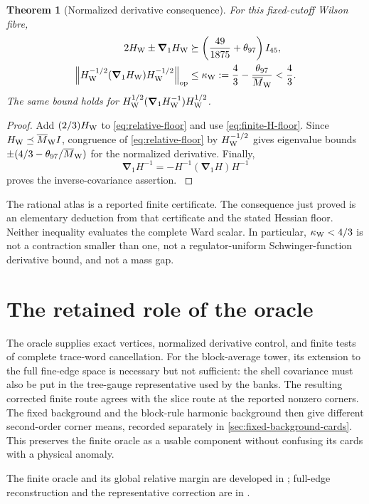 \documentclass[11pt,oneside,openany]{book}
\newtheorem{theorem}{Theorem}[chapter]
\theoremstyle{definition}
\theoremstyle{remark}
\newcommand{\op}{\mathrm{op}}
\newcommand{\norm}[1]{\left\lVert#1\right\rVert}
\newcommand{\src}[2]{\cite[#2]{#1}}
\newcommand{\sourcebasis}[1]{\par\smallskip\noindent #1\par}
\begin{document}
\begin{theorem}[Normalized derivative consequence]\label{thm:covariance-margin}
For this fixed-cutoff Wilson fibre,
\begin{align}
2H_{\rm W}\pm\boldsymbol\nabla_1H_{\rm W}
&\succeq\left(\frac{49}{1875}+\theta_{97}\right)I_{45},\label{eq:H2margin}\\
\norm{H_{\rm W}^{-1/2}(\boldsymbol\nabla_1H_{\rm W})H_{\rm W}^{-1/2}}_{\op}
&\le\kappa_{\rm W}:=\frac43-\frac{\theta_{97}}{\overline M_{\rm W}}<\frac43.
\label{eq:kappaW}
\end{align}
The same bound holds for
$H_{\rm W}^{1/2}(\boldsymbol\nabla_1H_{\rm W}^{-1})H_{\rm W}^{1/2}$.
\end{theorem}
\begin{proof}
Add $(2/3)H_{\rm W}$ to \cref{eq:relative-floor} and use \cref{eq:finite-H-floor}. Since $H_{\rm W}\preceq\overline M_{\rm W}I$, congruence of \cref{eq:relative-floor} by $H_{\rm W}^{-1/2}$ gives eigenvalue bounds $\pm(4/3-\theta_{97}/\overline M_{\rm W})$ for the normalized derivative. Finally,
\[
\boldsymbol\nabla_1H^{-1}=-H^{-1}(\boldsymbol\nabla_1H)H^{-1}
\]
proves the inverse-covariance assertion. \src{F10}{V97, V100}
\end{proof}

The rational atlas is a reported finite certificate. The consequence just proved is an elementary deduction from that certificate and the stated Hessian floor. Neither inequality evaluates the complete Ward scalar. In particular, $\kappa_{\rm W}<4/3$ is not a contraction smaller than one, not a regulator-uniform Schwinger-function derivative bound, and not a mass gap.

\section{The retained role of the oracle}
The oracle supplies exact vertices, normalized derivative control, and
finite tests of complete trace-word cancellation. For the block-average
tower, its extension to the full fine-edge space is necessary but not
sufficient: the shell covariance must also be put in the tree-gauge
representative used by the banks. The resulting corrected finite route
agrees with the slice route at the reported nonzero corners. The fixed
background and the block-rule harmonic background then give different
second-order corner means, recorded separately in
\cref{sec:fixed-background-cards}. This preserves the finite oracle as a
usable component without confusing its cards with a physical anomaly.
\sourcebasis{The finite oracle and its global relative margin are
developed in \cite{F9,F10}; full-edge reconstruction and the representative
correction are in \src{F11}{V39, V41}.}
\end{document}
